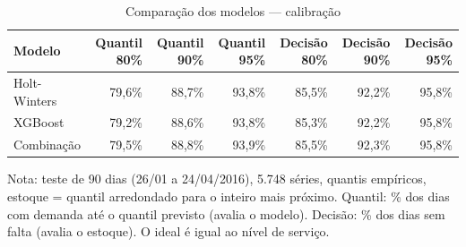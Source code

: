 \begin{table}[htbp]
\centering
\small
\caption{Comparação dos modelos — calibração}
\label{tab:comp_calibracao}
\begin{tabular}{lrrrrrr}
\toprule
Modelo & Quantil 80\% & Quantil 90\% & Quantil 95\% & Decisão 80\% & Decisão 90\% & Decisão 95\% \\
\midrule
Holt-Winters & 79,6\% & 88,7\% & 93,8\% & 85,5\% & 92,2\% & 95,8\% \\
XGBoost & 79,2\% & 88,6\% & 93,8\% & 85,3\% & 92,2\% & 95,8\% \\
Combinação & 79,5\% & 88,8\% & 93,9\% & 85,5\% & 92,3\% & 95,8\% \\
\bottomrule
\end{tabular}
\par\smallskip
{\footnotesize Nota: teste de 90 dias (26/01 a 24/04/2016), 5.748 séries, quantis empíricos, estoque = quantil arredondado para o inteiro mais próximo. Quantil: \% dos dias com demanda até o quantil previsto (avalia o modelo). Decisão: \% dos dias sem falta (avalia o estoque). O ideal é igual ao nível de serviço.}
\end{table}
